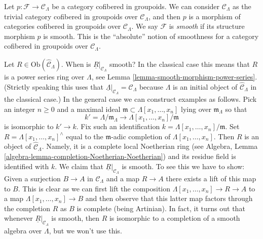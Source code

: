 \begin{remark}
\label{remark-cofibered-groupoid-projection-smooth}
Let $p : \mathcal{F} \to \mathcal{C}_\Lambda$ be a category cofibered in 
groupoids. We can consider $\mathcal{C}_\Lambda$ as the trivial category 
cofibered in groupoids over $\mathcal{C}_\Lambda$, and then $p$ is a morphism 
of categories cofibered in groupoids over $\mathcal{C}_\Lambda$. We say 
$\mathcal{F}$ is {\it smooth} if its structure morphism $p$ is smooth.
This is the ``absolute'' notion of smoothness for a category cofibered in
groupoids over $\mathcal{C}_\Lambda$.
\end{remark}

\begin{example}
\label{example-smooth}
Let $R \in \text{Ob}(\widehat{\mathcal{C}}_\Lambda)$.
When is $\underline{R}|_{\mathcal{C}_\Lambda}$ smooth?
In the classical case this means that $R$ is a power series
ring over $\Lambda$, see
Lemma \ref{lemma-smooth-morphism-power-series}.
(Strictly speaking this uses that
$\underline{\Lambda}|_{\mathcal{C}_\Lambda} = \mathcal{C}_\Lambda$
because $\Lambda$ is an initial object of $\widehat{\mathcal{C}}_\Lambda$
in the classical case.) In the general case we can construct examples
as follows. Pick an integer $n \geq 0$ and a maximal ideal
$\mathfrak m \subset \Lambda[x_1, \ldots, x_n]$ lying over
$\mathfrak m_\Lambda$ so that
$$
k' = \Lambda/\mathfrak m_\Lambda
\longrightarrow
\Lambda[x_1, \ldots, x_n]/\mathfrak m
$$
is isomorphic to $k' \to k$. Fix such an identification
$k = \Lambda[x_1, \ldots, x_n]/\mathfrak m$. Set
$R = \Lambda[x_1, \ldots, x_n]^\wedge$ equal to the $\mathfrak m$-adic
completion of $\Lambda[x_1, \ldots, x_n]$. Then $R$ is an object of
$\widehat{\mathcal{C}}_\Lambda$. Namely, it is a complete local
Noetherian ring (see
Algebra, Lemma \ref{algebra-lemma-completion-Noetherian-Noetherian})
and its residue field is identified with $k$.
We claim that $\underline{R}|_{\mathcal{C}_\Lambda}$ is smooth. To see
this we have to show: Given a surjection $B \to A$ in $\mathcal{C}_\Lambda$
and a map $R \to A$ there exists a lift of this map to $B$. This is clear
as we can first lift the composition
$\Lambda[x_1, \ldots, x_n] \to R \to A$ to a map
$\Lambda[x_1, \ldots, x_n] \to B$ and then observe that this latter map
factors through the completion $R$ as $B$ is complete (being Artinian).
In fact, it turns out that whenever $\underline{R}|_{\mathcal{C}_\Lambda}$
is smooth, then $R$ is isomorphic to a completion of a smooth
algebra over $\Lambda$, but we won't use this.
\end{example}

